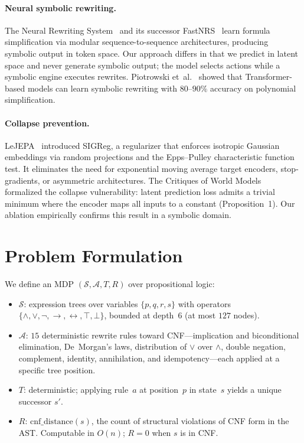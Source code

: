 \documentclass{article}
\begin{document}
\paragraph{Neural symbolic rewriting.}
The Neural Rewriting System~\cite{petruzzellis2024nrs} and its successor
FastNRS~\cite{petruzzellis2025fastnrs} learn formula simplification via
modular sequence-to-sequence architectures, producing symbolic output in
token space. Our approach differs in that we predict in latent space and
never generate symbolic output; the model selects actions while a symbolic
engine executes rewrites. Piotrowski et~al.~\cite{piotrowski2019neural}
showed that Transformer-based models can learn symbolic rewriting with
$80$--$90\%$ accuracy on polynomial simplification.

\paragraph{Collapse prevention.}
LeJEPA~\cite{balestriero2025lejepa} introduced SIGReg, a regularizer that
enforces isotropic Gaussian embeddings via random projections and the
Epps--Pulley characteristic function test. It eliminates the need for
exponential moving average target encoders, stop-gradients, or asymmetric
architectures. The Critiques of World Models~\cite{xing2025critiques}
formalized the collapse vulnerability: latent prediction loss admits a
trivial minimum where the encoder maps all inputs to a constant
(Proposition~1). Our ablation empirically confirms this result in a symbolic
domain.

\section{Problem Formulation}

We define an MDP $(\mathcal{S}, \mathcal{A}, T, R)$ over propositional
logic:

\begin{itemize}
\item $\mathcal{S}$: expression trees over variables $\{p, q, r, s\}$ with
operators $\{\wedge, \vee, \neg, \rightarrow, \leftrightarrow, \top,
\bot\}$, bounded at depth~$6$ (at most $127$ nodes).
\item $\mathcal{A}$: $15$ deterministic rewrite rules toward CNF---implication
and biconditional elimination, De~Morgan's laws, distribution of $\vee$
over $\wedge$, double negation, complement, identity, annihilation, and
idempotency---each applied at a specific tree position.
\item $T$: deterministic; applying rule~$a$ at position~$p$ in state~$s$
yields a unique successor $s'$.
\item $R$: $\text{cnf\_distance}(s)$, the count of structural violations
of CNF form in the AST. Computable in $O(n)$; $R = 0$ when $s$ is in CNF.
\end{itemize}
\end{document}

